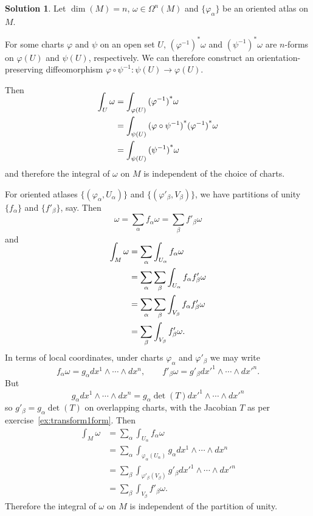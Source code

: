 \documentclass[11pt, a4paper]{report}
\theoremstyle{definition}
\newtheorem{solution}{Solution}[part]
\newenvironment{sol}{\begin{solution}}{\end{solution}\pagebreak[3]}
\begin{document}
\begin{sol}


Let $\dim(M) = n$, $\omega \in \Omega^n(M)$ and $\{\varphi_\alpha\}$ be an oriented atlas on $M$.

For some charts $\varphi$ and $\psi$ on an open set $U$, ${(\varphi^{-1})}^* \omega$ and ${(\psi^{-1})}^* \omega$ are $n$-forms on $\varphi(U)$ and $\psi(U)$, respectively. We can therefore construct an orientation-preserving diffeomorphism $\varphi \circ \psi^{-1}: \psi(U) \to \varphi(U)$.

Then
\begin{align*}
    \SwapAboveDisplaySkip
    \int_U \omega &= \int_{\varphi(U)} {(\varphi^{-1})}^* \omega \\
                  &= \int_{\psi(U)} {(\varphi \circ \psi^{-1})}^* {(\varphi^{-1})}^* \omega \\
                  &= \int_{\psi(U)} {(\psi^{-1})}^* \omega
\end{align*}
and therefore the integral of $\omega$ on $M$ is independent of the choice of charts.

For oriented atlases $\{(\varphi_\alpha, U_\alpha)\}$ and $\{(\varphi'_\beta, V_\beta)\}$, we have partitions of unity $\{f_\alpha\}$ and $\{f'_\beta\}$, say. Then
\[
    \omega = \sum_\alpha f_\alpha \omega = \sum_\beta f'_\beta \omega
\]
and
\begin{align*}
    \SwapAboveDisplaySkip
    \int_M \omega &= \sum_\alpha \int_{U_\alpha} f_\alpha \omega \\
                  &= \sum_\alpha \sum_\beta \int_{U_\alpha} f_\alpha f'_\beta \omega \\
                  &= \sum_\alpha \sum_\beta \int_{V_\beta} f_\alpha f'_\beta \omega \\
                  &= \sum_\beta \int_{V_\beta} f'_\beta \omega.
\end{align*}
In terms of local coordinates, under charts $\varphi_\alpha$ and $\varphi'_\beta$ we may write
\[
    f_\alpha \omega = g_\alpha dx^1 \wedge \cdots \wedge dx^n, \qquad
    f'_\beta \omega = g'_\beta dx'^1 \wedge \cdots \wedge dx'^n.
\]
But
\[
    g_\alpha dx^1 \wedge \cdots \wedge dx^n = g_\alpha \det(T) dx'^1 \wedge \cdots \wedge dx'^n
\]
so $g'_\beta = g_\alpha \det(T)$ on overlapping charts, with the Jacobian $T$ as per exercise~\ref{ex:transform1form}.
Then
\begin{align*}
    \int_M \omega &= \sum_\alpha \int_{U_\alpha} f_\alpha \omega \\
        &= \sum_\alpha \int_{\varphi_\alpha(U_\alpha)} g_\alpha dx^1 \wedge \cdots \wedge dx^n \\
        &= \sum_\beta \int_{\varphi'_\beta(V_\beta)} g'_\beta dx'^1 \wedge \cdots \wedge dx'^n \\
        &= \sum_\beta \int_{V_\beta} f'_\beta \omega.
\end{align*}
Therefore the integral of $\omega$ on $M$ is independent of the partition of unity.

\end{sol}
\end{document}
